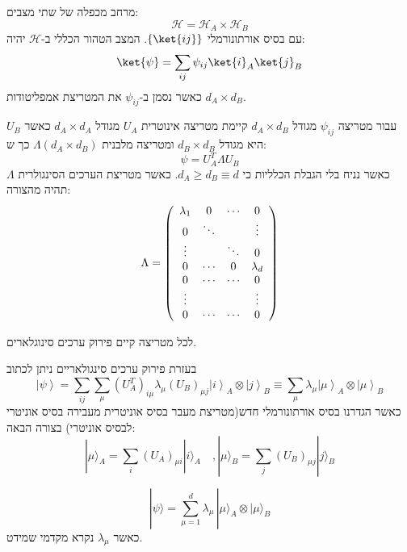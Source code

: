 \documentclass{tstextbook}
\begin{document}
\begin{definition}
מרחב מכפלה של שתי מצבים:
$$\mathcal{H}=\mathcal{H}_{A}\times \mathcal{H}_{B}$$
עם בסיס אורתונורמלי \(\{ \ket{ij} \}\). המצב הטהור הכללי ב-\(\mathcal{H}\) יהיה:
$$\ket{\psi} = \sum_{ij} \psi_{ij} \ket{i} _{A}\ket{j} _{B}$$
כאשר נסמן ב-\(\psi_{ij}\) את המטריצת אמפליטודות \(d_{A}\times d_{B}\).

\end{definition}
\begin{definition}
עבור מטריצה \(\psi_{ij}\) מגודל \(d_{A}\times d_{B}\) קיימת מטריצה אינוטרית \(U_{A}\) מגודל \(d_{A}\times d_{A}\) כאשר \(U_{B}\) היא מגודל \(d_{B}\times d_{B}\) ומטריצה מלבנית \(\Lambda\left( d_{A}\times d_{B} \right)\) כך ש:
$$\psi=U_{A}^{T}\Lambda U_{B}$$
כאשר נניח בלי הגבלת הכלליות כי \(d_{A}\geq d_{B}\equiv d\). כאשר מטריצת הערכים הסינגולרית \(\Lambda\) תהיה מהצורה:
$$\Lambda=\left(\begin{array}{c c c c}{{\lambda_{1}}}&{{0}}&{{\cdots}}&{{0}}\\ {{0}}&{{\ddots}}&&{{\vdots}}\\ {{\vdots}}&{{}}&{{\ddots}}&{{0}}\\ {{0}}&{{\cdots}}&{{0}}&{{\lambda_{d}}}\\ {{0}}&{{\cdots}}&{{\cdots}}&{{0}}\\ {{\vdots}}&{{}}&{{}}&{{\vdots}}\\ {{0}}&{{\cdots}}&{{\cdots}}&{{0}}\end{array}\right)$$

\end{definition}
\begin{proposition}
לכל מטריצה קיים פירוק ערכים סינוגלארים.

\end{proposition}
\begin{proposition}
בעזרת פירוק ערכים סינגולאריים ניתן לכתוב
$$\left|\psi\right\rangle=\sum_{i j}\sum_{\mu}\left(U_{A}^{T}\right)_{i\mu}\lambda_{\mu}\left(U_{B}\right)_{\mu j}\left|i\right\rangle_{A}\otimes\left|j\right\rangle_{B}\equiv\sum_{\mu}\lambda_{\mu}\left|\mu\right\rangle_{A}\otimes\left|\mu\right\rangle_{B}$$
כאשר הגדרנו בסיס אורתונורמלי חדש(מטריצת מעבר בסיס אוניטרית מעבירה בסיס אוניטרי לבסיס אוניטרי) בצורה הבאה:
$$|\mu\rangle_{A}=\sum_{i}\left(U_{A}\right)_{\mu i}|i\rangle_{A}\quad,|\mu\rangle_{B}=\sum_{j}\left(U_{B}\right)_{\mu j}|j\rangle_{B}$$

\end{proposition}
\begin{definition}
$$|\psi\rangle=\sum_{\mu=1}^{d}\lambda_{\mu}\,|\mu\rangle_{A}\otimes|\mu\rangle_{B}$$
כאשר \(\lambda_{\mu}\) נקרא מקדמי שמידט.

\end{definition}
\end{document}
